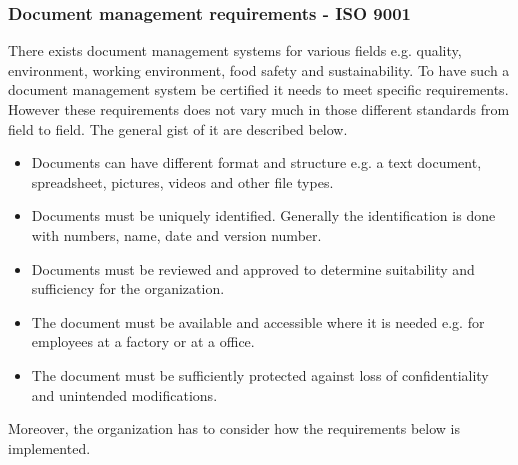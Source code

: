 \subsubsection{Document management requirements - ISO 9001} \label{sec:DMR}
There exists document management systems for various fields e.g. quality, environment, working environment, food safety and sustainability.
To have such a document management system be certified it needs to meet specific requirements.
However these requirements does not vary much in those different standards from field to field.
The general gist of it are described below.

\begin{itemize}
	\item
	Documents can have different format and structure e.g. a text document, spreadsheet, pictures, videos and other file types.
	\item
	Documents must be uniquely identified.
	Generally the identification is done with numbers, name, date and version number.
	\item
	Documents must be reviewed and approved to determine suitability and sufficiency for the organization.
	\item
	The document must be available and accessible where it is needed e.g. for employees at a factory or at a office.
	\item
	The document must be sufficiently protected against loss of confidentiality and unintended modifications.
\end{itemize}

Moreover, the organization has to consider how the requirements below is implemented.


